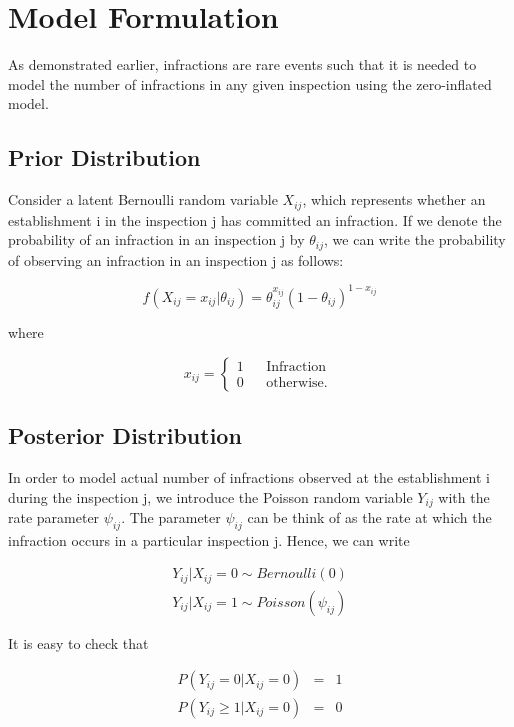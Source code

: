 \documentclass[twoside,onecolumn]{article}
\begin{document}



\section{Model Formulation}
As demonstrated earlier, infractions are rare events such that it is needed to model the number of infractions in any given inspection using the zero-inflated model. 

\subsection{Prior Distribution}
Consider a latent Bernoulli random variable $X_{ij}$, which represents whether an establishment i in the inspection j has committed an infraction. If we denote the probability of an infraction in an inspection j by $\theta_{ij}$, we can write the probability of observing an infraction in an inspection j as follows:

\[
f(X_{ij} = x_{ij} | \theta_{ij}) = \theta_{ij}^{x_{ij}}(1-\theta_{ij})^{1-x_{ij}}
\]

where

$$
x_{ij} = 
\left\{  \begin{array}{lcl}
           1  & & \text{Infraction }\\
           0 & & \text{otherwise.}
          \end{array}
\right.
$$

\subsection{Posterior Distribution}
In order to model actual number of infractions observed at the establishment i during the inspection j, we introduce the Poisson random variable $Y_{ij}$ with the rate parameter $\psi_{ij}$. The parameter $\psi_{ij}$ can be think of as the rate at which the infraction occurs in a particular inspection j. Hence, we can write

$$
\begin{array}{rcl}
Y_{ij} | X_{ij} = 0 \sim Bernoulli(0) \\
Y_{ij} | X_{ij} = 1 \sim Poisson(\psi_{ij})
\end{array}
$$

It is easy to check that

$$
\begin{array}{rcl}
P(Y_{ij} = 0 | X_{ij} = 0)&=& 1 \\
P(Y_{ij} \geq 1 | X_{ij} = 0) &=&  0
\end{array}
$$
\end{document}

